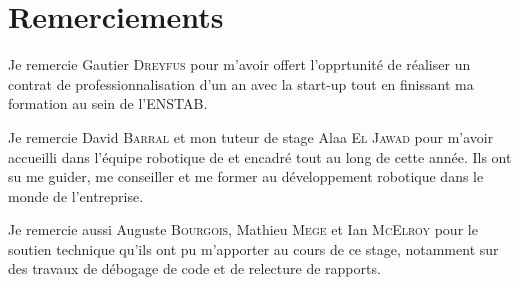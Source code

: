 
\section*{Remerciements}

Je remercie Gautier \textsc{Dreyfus} pour m'avoir offert l'opprtunité de réaliser un contrat de professionnalisation d'un an avec la start-up \forssea{} tout en finissant ma formation au sein de l'\gls{ENSTAB}.

Je remercie David \textsc{Barral} et mon tuteur de stage Alaa \textsc{El Jawad} pour m'avoir accueilli dans l'équipe robotique de \forssea{} et encadré tout au long de cette année. Ils ont su me guider, me conseiller et me former au développement robotique dans le monde de l'entreprise.

Je remercie aussi Auguste \textsc{Bourgois}, Mathieu \textsc{Mege} et Ian \textsc{McElroy} pour le soutien technique qu'ils ont pu m'apporter au cours de ce stage, notamment sur des travaux de débogage de code et de relecture de rapports.